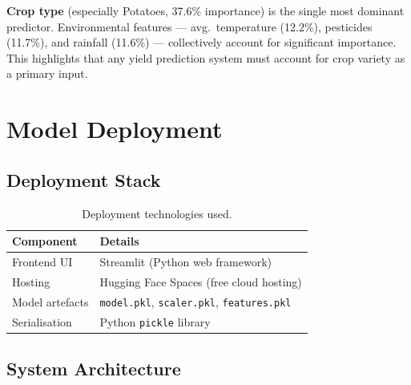 \documentclass[12pt,a4paper]{article}
\newenvironment{insightbox}[1][Insight]{%
  \begin{mdframed}[linecolor=accent,linewidth=0.8pt,
    backgroundcolor=lightblue!25,
    innertopmargin=7pt,innerbottommargin=7pt,
    innerleftmargin=10pt,innerrightmargin=10pt,
    frametitle={\small\bfseries\color{white}\,#1},
    frametitlebackgroundcolor=accent,frametitlerule=false,
    frametitleaboveskip=3pt,frametitlebelowskip=3pt]\small
}{\end{mdframed}}
\begin{document}
\begin{insightbox}[Key Finding]
\textbf{Crop type} (especially Potatoes, 37.6\% importance) is the single most
dominant predictor. Environmental features --- avg.\ temperature (12.2\%), pesticides
(11.7\%), and rainfall (11.6\%) --- collectively account for significant importance.
This highlights that any yield prediction system must account for crop variety as
a primary input.
\end{insightbox}

\section{Model Deployment}

\subsection{Deployment Stack}

\begin{table}[H]
\centering
\caption{Deployment technologies used.}
\renewcommand{\arraystretch}{1.3}
\begin{tabularx}{\textwidth}{L{3.5cm} X}
\toprule
{}
\color{white}\textbf{Component} & \color{white}\textbf{Details} \\
\midrule
{}
Frontend UI     & Streamlit (Python web framework) \\
Hosting         & Hugging Face Spaces (free cloud hosting) \\
Model artefacts & \texttt{model.pkl}, \texttt{scaler.pkl}, \texttt{features.pkl} \\
Serialisation   & Python \texttt{pickle} library \\
\bottomrule
\end{tabularx}
\end{table}

\subsection{System Architecture}
\end{document}
